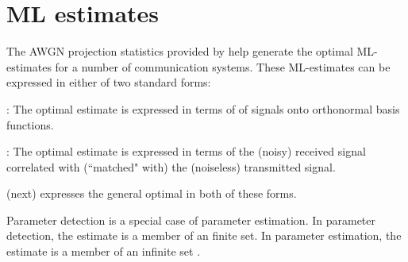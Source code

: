 \section{ML estimates}
\label{sec:awgn_est}
The AWGN projection statistics provided by
 help generate the optimal
ML-estimates for a number of communication systems.
These ML-estimates can be expressed in either of two standard forms:
\begin{liste}
  \item {}:
     The optimal estimate is expressed in terms of 
     of signals onto orthonormal basis functions.
  \item {}:
     The optimal estimate is expressed in terms of the (noisy)
     received signal correlated with (``matched" with)
     the (noiseless) transmitted signal.
\end{liste}
 (next) expresses the general
optimal  in both of these forms.

Parameter detection is a special case of parameter estimation.
In parameter detection, the estimate is a member of an finite set.
In parameter estimation, the estimate is a member of an infinite set
.

